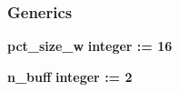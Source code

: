 \subsubsection*{Generics}
 \begin{DoxyCompactItemize}
\item 
{\bf pct\+\_\+size\+\_\+w} {\bfseries {\bfseries \textcolor{comment}{integer}\textcolor{vhdlchar}{ }\textcolor{vhdlchar}{ }\textcolor{vhdlchar}{\+:}\textcolor{vhdlchar}{=}\textcolor{vhdlchar}{ }\textcolor{vhdlchar}{ } \textcolor{vhdldigit}{16} \textcolor{vhdlchar}{ }}}
\item 
{\bf n\+\_\+buff} {\bfseries {\bfseries \textcolor{comment}{integer}\textcolor{vhdlchar}{ }\textcolor{vhdlchar}{ }\textcolor{vhdlchar}{\+:}\textcolor{vhdlchar}{=}\textcolor{vhdlchar}{ }\textcolor{vhdlchar}{ } \textcolor{vhdldigit}{2} \textcolor{vhdlchar}{ }}}
\end{DoxyCompactItemize}
